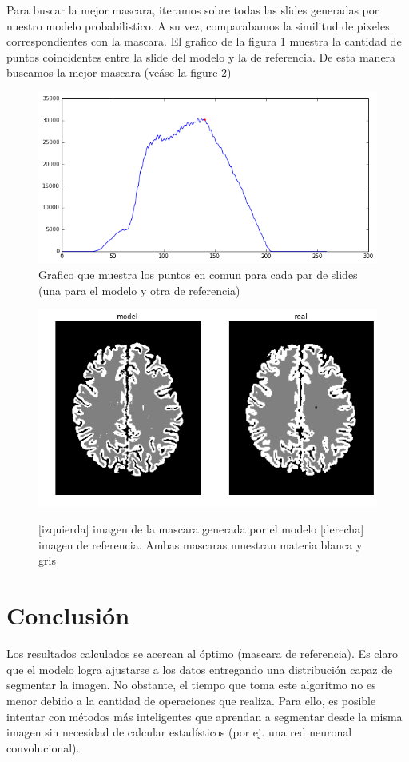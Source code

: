 \documentclass[conference]{IEEEtran}
\begin{document}
Para buscar la mejor mascara, iteramos sobre todas las slides generadas por nuestro modelo probabilistico. A su vez, comparabamos la similitud de pixeles correspondientes con la mascara. El grafico de la figura 1 muestra la cantidad de puntos coincidentes entre la slide del modelo y la de referencia. De esta manera buscamos la mejor mascara (veáse la figure 2)
\begin{figure}
\includegraphics[scale=0.4]{img/best_mask.png} 
\caption{Grafico que muestra los puntos en comun para cada par de slides (una para el modelo y otra de referencia)}
\end{figure}
\begin{figure}
\includegraphics[scale=0.4]{img/brain_mask.png}\\
\caption{[izquierda] imagen de la mascara generada por el modelo [derecha] imagen de referencia. Ambas mascaras muestran materia blanca y gris}
\end{figure}
\section{Conclusión}
Los resultados calculados se acercan al óptimo (mascara de referencia). Es claro que el modelo logra ajustarse a los datos entregando una distribución capaz de segmentar la imagen. No obstante, el tiempo que toma este algoritmo no es menor debido a la cantidad de operaciones que realiza. Para ello, es posible intentar con métodos más inteligentes que aprendan a segmentar desde la misma imagen sin necesidad de calcular estadísticos (por ej. una red neuronal convolucional).\\\\\\\\\
\end{document}
